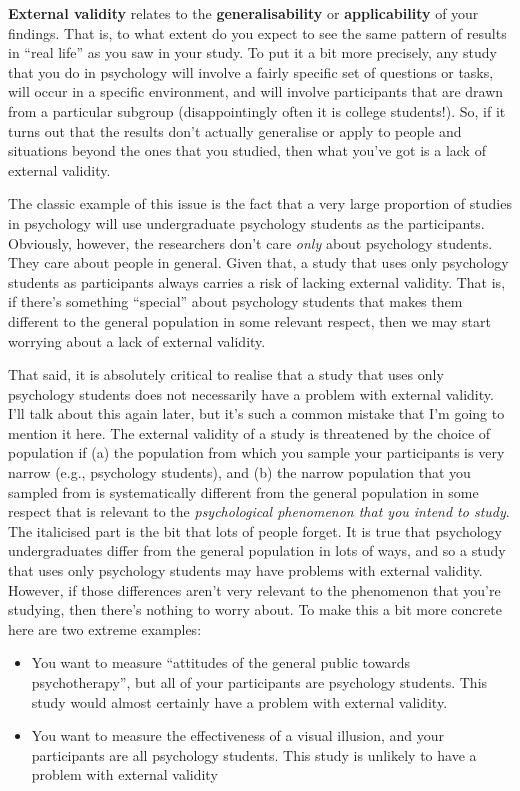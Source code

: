 \documentclass[
  letterpaper,
]{book}
\providecommand{\tightlist}{%
  \setlength{\itemsep}{0pt}\setlength{\parskip}{0pt}}\usepackage{longtable,booktabs,array}
\begin{document}
\textbf{External validity} relates to the \textbf{generalisability} or
\textbf{applicability} of your findings. That is, to what extent do you
expect to see the same pattern of results in ``real life'' as you saw in
your study. To put it a bit more precisely, any study that you do in
psychology will involve a fairly specific set of questions or tasks,
will occur in a specific environment, and will involve participants that
are drawn from a particular subgroup (disappointingly often it is
college students!). So, if it turns out that the results don't actually
generalise or apply to people and situations beyond the ones that you
studied, then what you've got is a lack of external validity.

The classic example of this issue is the fact that a very large
proportion of studies in psychology will use undergraduate psychology
students as the participants. Obviously, however, the researchers don't
care \emph{only} about psychology students. They care about people in
general. Given that, a study that uses only psychology students as
participants always carries a risk of lacking external validity. That
is, if there's something ``special'' about psychology students that
makes them different to the general population in some relevant respect,
then we may start worrying about a lack of external validity.

That said, it is absolutely critical to realise that a study that uses
only psychology students does not necessarily have a problem with
external validity. I'll talk about this again later, but it's such a
common mistake that I'm going to mention it here. The external validity
of a study is threatened by the choice of population if (a) the
population from which you sample your participants is very narrow (e.g.,
psychology students), and (b) the narrow population that you sampled
from is systematically different from the general population in some
respect that is relevant to the \emph{psychological phenomenon that you
intend to study}. The italicised part is the bit that lots of people
forget. It is true that psychology undergraduates differ from the
general population in lots of ways, and so a study that uses only
psychology students may have problems with external validity. However,
if those differences aren't very relevant to the phenomenon that you're
studying, then there's nothing to worry about. To make this a bit more
concrete here are two extreme examples:

\begin{itemize}
\tightlist
\item
  You want to measure ``attitudes of the general public towards
  psychotherapy'', but all of your participants are psychology students.
  This study would almost certainly have a problem with external
  validity.
\item
  You want to measure the effectiveness of a visual illusion, and your
  participants are all psychology students. This study is unlikely to
  have a problem with external validity
\end{itemize}
\end{document}
